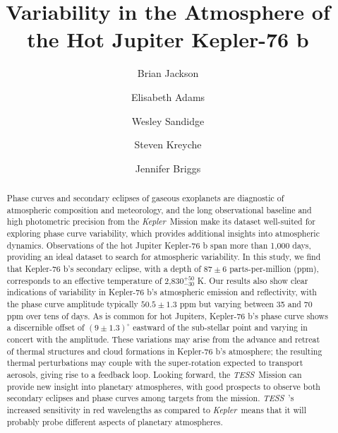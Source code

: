 \documentclass[manuscript]{aastex62}
\newcommand{\kepler}{{\it Kepler}}
\newcommand{\tess}{{\it TESS}}
\begin{document}
\title{Variability in the Atmosphere of the Hot Jupiter Kepler-76 b}


\author{Brian Jackson}

\author{Elisabeth Adams}

\author{Wesley Sandidge}

\author{Steven Kreyche}

\author{Jennifer Briggs}





\begin{abstract}
Phase curves and secondary eclipses of gaseous exoplanets are diagnostic of atmospheric composition and meteorology, and the long observational baseline and high photometric precision from the \kepler\ Mission make its dataset well-suited for exploring phase curve variability, which provides additional insights into atmospheric dynamics. Observations of the hot Jupiter Kepler-76 b span more than 1,000 days, providing an ideal dataset to search for atmospheric variability. In this study, we find that Kepler-76 b's secondary eclipse, with a depth of $87 \pm 6$ parts-per-million (ppm), corresponds to an effective temperature of 2,830$^{+50}_{-30}$ K. Our results also show clear indications of variability in Kepler-76 b's atmospheric emission and reflectivity, with the phase curve amplitude typically $50.5 \pm 1.3$ ppm but varying between 35 and 70 ppm over tens of days. As is common for hot Jupiters, Kepler-76 b's phase curve shows a discernible offset of $\left( 9 \pm 1.3 \right)^\circ$ eastward of the sub-stellar point and varying in concert with the amplitude. These variations may arise from the advance and retreat of thermal structures and cloud formations in Kepler-76 b's atmosphere; the resulting thermal perturbations may couple with the super-rotation expected to transport aerosols, giving rise to a feedback loop. Looking forward, the \tess\ Mission can provide new insight into planetary atmospheres, with good prospects to observe both secondary eclipses and phase curves among targets from the mission. \tess\ 's increased sensitivity in red wavelengths as compared to \kepler\ means that it will probably probe different aspects of planetary atmospheres.

\end{abstract}
\end{document}
